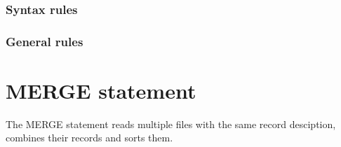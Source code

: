 
\subsubsection{Syntax rules}

\subsubsection{General rules}

\section{MERGE statement}

The MERGE statement reads multiple files with the same record desciption, combines their records and sorts them.

